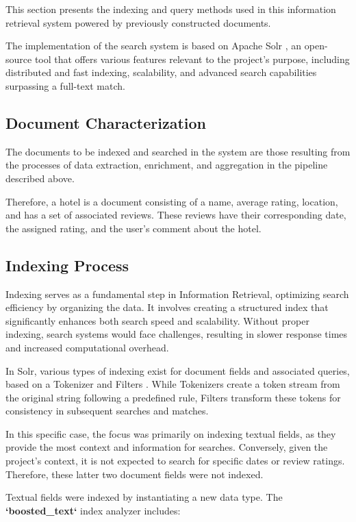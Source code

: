 \documentclass[sigconf]{acmart}
\begin{document}
This section presents the indexing and query methods used in this information retrieval system powered by previously constructed documents. 

The implementation of the search system is based on Apache Solr \cite{Apache_Solr} , an open-source tool that offers various features relevant to the project's purpose, including distributed and fast indexing, scalability, and advanced search capabilities surpassing a full-text match.

\subsection{Document Characterization}

The documents to be indexed and searched in the system are those resulting from the processes of data extraction, enrichment, and aggregation in the pipeline described above.

Therefore, a hotel is a document consisting of a name, average rating, location, and has a set of associated reviews. These reviews have their corresponding date, the assigned rating, and the user's comment about the hotel.

\subsection{ Indexing Process}

Indexing serves as a fundamental step in Information Retrieval, optimizing search efficiency by organizing the data. It involves creating a structured index that significantly enhances both search speed and scalability. Without proper indexing, search systems would face challenges, resulting in slower response times and increased computational overhead.

In Solr, various types of indexing exist for document fields and associated queries, based on a Tokenizer \cite{Solr_Tokenizers} and Filters \cite{Solr_Filters}. While Tokenizers create a token stream from the original string following a predefined rule, Filters transform these tokens for consistency in subsequent searches and matches.
    
In this specific case, the focus was primarily on indexing textual fields, as they provide the most context and information for searches. Conversely, given the project's context, it is not expected to search for specific dates or review ratings. Therefore, these latter two document fields were not indexed.

Textual fields were indexed by instantiating a new data type. The \textbf{`boosted\_text`} index analyzer includes:
\end{document}
